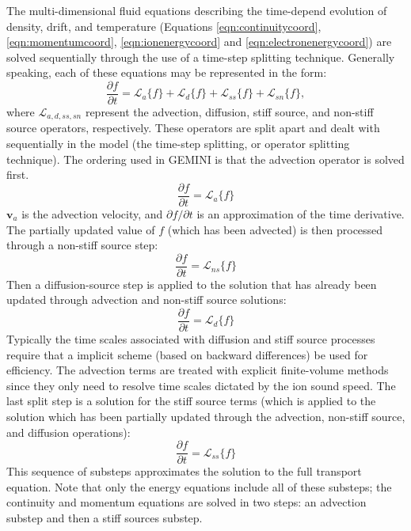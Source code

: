 \documentclass[11pt,letterpaper]{article}
\begin{document}
The multi-dimensional fluid equations describing the time-depend evolution of density, drift, and temperature (Equations \ref{eqn:continuitycoord}, \ref{eqn:momentumcoord}, \ref{eqn:ionenergycoord} and \ref{eqn:electronenergycoord}) are solved sequentially through the use of a time-step splitting technique.  Generally speaking, each of these equations may be represented in the form:
\begin{equation}
\frac{\partial f}{\partial t} = \mathcal{L}_a \{f\} + \mathcal{L}_d \{f\} + \mathcal{L}_{ss} \{f\} + \mathcal{L}_{sn} \{f\},
\end{equation}
where $\mathcal{L}_{a,d,ss,sn}$ represent the advection, diffusion, stiff source, and non-stiff source operators, respectively.  These operators are split apart and dealt with sequentially in the model (the time-step splitting, or operator splitting technique).  The ordering used in GEMINI is that the advection operator is solved first.
\begin{equation}
\frac{\partial f}{\partial t} = \mathcal{L}_a \{f\} 
\end{equation}
$\mathbf{v}_a$ is the advection velocity, and $\partial f / \partial t$ is an approximation of the time derivative.  The partially updated value of $f$ (which has been advected) is then processed through a non-stiff source step:
\begin{equation}
\frac{\partial f}{\partial t} = \mathcal{L}_{ns} \{f\} 
\end{equation}
Then a diffusion-source step is applied to the solution that has already been updated through advection and non-stiff source solutions:  
\begin{equation}
\frac{\partial f}{\partial t} = \mathcal{L}_d \{f\} 
\end{equation}
Typically the time scales associated with diffusion and stiff source processes require that a implicit scheme (based on backward differences) be used for efficiency.  The advection terms are treated with explicit finite-volume methods since they only need to resolve time scales dictated by the ion sound speed.  The last split step is a solution for the stiff source terms (which is applied to the solution which has been partially updated through the advection, non-stiff source, and diffusion operations):
\begin{equation}
\frac{\partial f}{\partial t} = \mathcal{L}_{ss} \{f\} 
\end{equation}
This sequence of substeps approximates the solution to the full transport equation.  Note that only the energy equations include all of these substeps; the continuity and momentum equations are solved in two steps:  an advection substep and then a stiff sources substep.  
\end{document}
